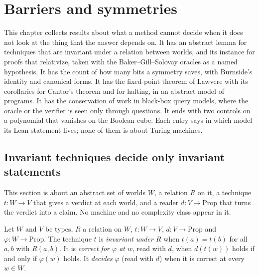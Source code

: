 \chapter{Barriers and symmetries}
\label{chap:barriers}

This chapter collects results about what a method cannot decide when it does not look at the
thing that the answer depends on. It has an abstract lemma for techniques that are invariant under
a relation between worlds, and its instance for proofs that relativize, taken with the
Baker--Gill--Solovay oracles as a named hypothesis. It has the count of how many bits a symmetry
saves, with Burnside's identity and canonical forms. It has the fixed-point theorem of Lawvere with
its corollaries for Cantor's theorem and for halting, in an abstract model of programs. It has the
conservation of work in black-box query models, where the oracle or the verifier is seen only
through questions. It ends with two controls on a polynomial that vanishes on the Boolean cube.
Each entry says in which model its Lean statement lives; none of them is about Turing machines.


\section{Invariant techniques decide only invariant statements}
\label{sec:barriers-curie}

This section is about an abstract set of worlds $W$, a relation $R$ on it, a technique $t : W \to
V$ that gives a verdict at each world, and a reader $d : V \to \mathrm{Prop}$ that turns the verdict
into a claim. No machine and no complexity class appear in it.

\begin{definition}
  \label{def:barriers-invariant-decide}
  \leanok
  Let $W$ and $V$ be types, $R$ a relation on $W$, $t : W \to V$, $d : V \to \mathrm{Prop}$ and
  $\varphi : W \to \mathrm{Prop}$. The technique $t$ is \emph{invariant under $R$} when $t(a) = t(b)$
  for all $a, b$ with $R(a,b)$. It is \emph{correct for $\varphi$ at $w$}, read with $d$, when
  $d(t(w))$ holds if and only if $\varphi(w)$ holds. It \emph{decides} $\varphi$ (read with $d$)
  when it is correct at every $w \in W$.
  \own{}
\end{definition}

